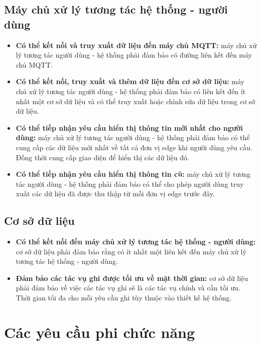 \subsection{Máy chủ xử lý tương tác hệ thống - người dùng}
\begin{itemize}
    \item \textbf{Có thể kết nối và truy xuất dữ liệu đến máy chủ MQTT:} máy chủ xử lý tương tác người dùng - hệ thống phải đảm bảo có đường liên kết đến máy chủ MQTT.
    \item \textbf{Có thể kết nối, truy xuất và thêm dữ liệu đến cơ sở dữ liệu:} máy chủ xử lý tương tác người dùng - hệ thống phải đảm bảo có liên kết đến ít nhất một cơ sở dữ liệu và có thể truy xuất hoặc chỉnh sửa dữ liệu trong cơ sở dữ liệu.
    \item \textbf{Có thể tiếp nhận yêu cầu hiển thị thông tin mới nhất cho người dùng:} máy chủ xử lý tương tác người dùng - hệ thống phải đảm bảo có thể cung cấp các dữ liệu mới nhất về tất cả đơn vị edge khi người dùng yêu cầu. Đồng thời cung cấp giao diện để hiển thị các dữ liệu đó.
    \item \textbf{Có thể tiếp nhận yêu cầu hiển thị thông tin cũ:} máy chủ xử lý tương tác người dùng - hệ thống phải đảm bảo có thể cho phép người dùng truy xuất các dữ liệu đã được thu thập từ mỗi đơn vị edge trước đây.
\end{itemize}

\subsection{Cơ sở dữ liệu}
\begin{itemize}
    \item \textbf{Có thể kết nối đến máy chủ xử lý tương tác hệ thống - người dùng:} cơ sở dữ liệu phải đảm bảo rằng có ít nhất một liên kết đến máy chủ xử lý tương tác hệ thống - người dùng.
    \item \textbf{Đảm bảo các tác vụ ghi được tối ưu về mặt thời gian:} cơ sở dữ liệu phải đảm bảo về việc các tác vụ ghi sẽ là các tác vụ chính và cần tối ưu. Thời gian tối đa cho mỗi yêu cầu ghi tùy thuộc vào thiết kế hệ thống.
\end{itemize}

\section{Các yêu cầu phi chức năng}

